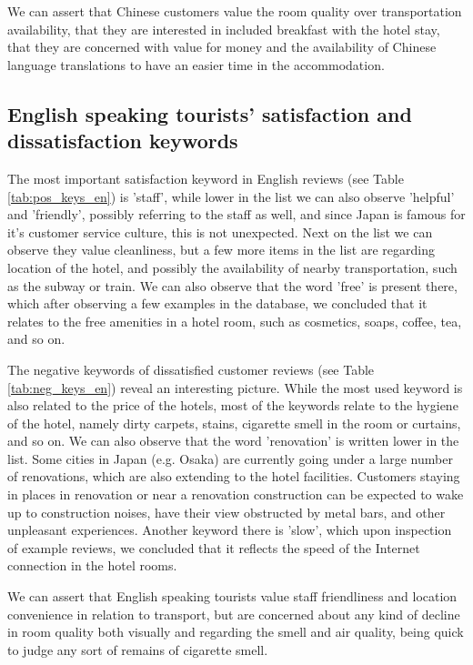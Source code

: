 \documentclass[review]{elsarticle}
\begin{document}
We can assert that Chinese customers value the room quality over transportation availability, that they are interested in included breakfast with the hotel stay, that they are concerned with value for money and the availability of Chinese language translations to have an easier time in the accommodation.

\subsection{English speaking tourists' satisfaction and dissatisfaction keywords}

The most important satisfaction keyword in English reviews (see Table \ref{tab:pos_keys_en}) is 'staff', while lower in the list we can also observe 'helpful' and 'friendly', possibly referring to the staff as well, and since Japan is famous for it's customer service culture, this is not unexpected. Next on the list we can observe they value cleanliness, but a few more items in the list are regarding location of the hotel, and possibly the availability of nearby transportation, such as the subway or train. We can also observe that the word 'free' is present there, which after observing a few examples in the database, we concluded that it relates to the free amenities in a hotel room, such as cosmetics, soaps, coffee, tea, and so on.

The negative keywords of dissatisfied customer reviews (see Table \ref{tab:neg_keys_en}) reveal an interesting picture. While the most used keyword is also related to the price of the hotels, most of the keywords relate to the hygiene of the hotel, namely dirty carpets, stains, cigarette smell in the room or curtains, and so on. We can also observe that the word 'renovation' is written lower in the list. Some cities in Japan (e.g. Osaka) are currently going under a large number of renovations, which are also extending to the hotel facilities. Customers staying in places in renovation or near a renovation construction can be expected to wake up to construction noises, have their view obstructed by metal bars, and other unpleasant experiences. Another keyword there is 'slow', which upon inspection of example reviews, we concluded that it reflects the speed of the Internet connection in the hotel rooms.

We can assert that English speaking tourists value staff friendliness and location convenience in relation to transport, but are concerned about any kind of decline in room quality both visually and regarding the smell and air quality, being quick to judge any sort of remains of cigarette smell.
\end{document}
